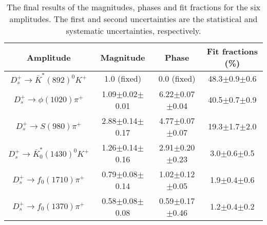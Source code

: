{    \begin{table}[htbp]
        \caption{The final results of the magnitudes, phases and fit fractions for the six amplitudes. The first and second uncertainties are the statistical and systematic uncertainties, respectively.}
        \label{final-result}
        \begin{center}
            \begin{tabular}{cccc}
                \toprule\toprule
                Amplitude & Magnitude  & Phase  & Fit fractions (\%)\\
                \hline
                $D_{s}^{+} \rightarrow \bar{K}^{*}(892)^{0}K^{+}$              & 1.0 (fixed)             & 0.0 (fixed)                & 48.3$\pm$0.9$\pm$0.6\\
                $D_{s}^{+} \rightarrow \phi(1020)\pi^{+}$                      & 1.09$\pm$0.02$\pm$0.01 & 6.22$\pm$0.07$\pm$0.04    & 40.5$\pm$0.7$\pm$0.9\\
                $D_{s}^{+} \rightarrow S(980)\pi^{+}$                          & 2.88$\pm$0.14$\pm$0.17 & 4.77$\pm$0.07$\pm$0.07    & 19.3$\pm$1.7$\pm$2.0\\
                $D_{s}^{+} \rightarrow \bar{K}^{*}_{0}(1430)^{0}K^{+}$         & 1.26$\pm$0.14$\pm$0.16 & 2.91$\pm$0.20$\pm$0.23    & 3.0$\pm$0.6$\pm$0.5\\
                $D_{s}^{+} \rightarrow f_{0}(1710)\pi^{+}$                     & 0.79$\pm$0.08$\pm$0.14 & 1.02$\pm$0.12$\pm$0.05    & 1.9$\pm$0.4$\pm$0.6\\
                $D_{s}^{+} \rightarrow f_{0}(1370)\pi^{+}$                     & 0.58$\pm$0.08$\pm$0.08 & 0.59$\pm$0.17$\pm$0.46    & 1.2$\pm$0.4$\pm$0.2\\
                \bottomrule\bottomrule
            \end{tabular}
        \end{center}
    \end{table}
}
